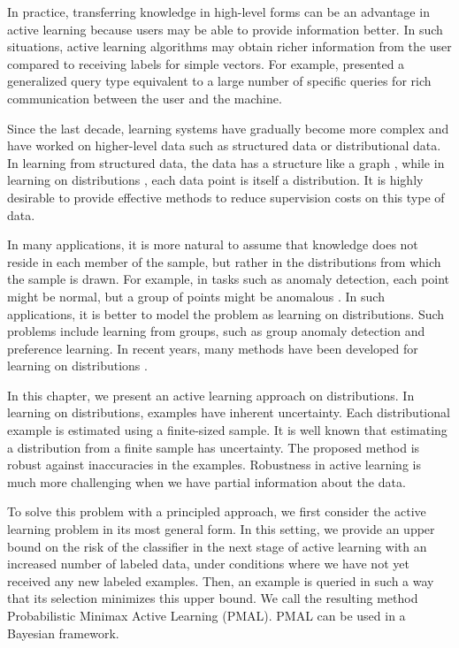 	In practice, transferring knowledge in high-level forms can be an advantage in active learning because users may be able to provide information better. In such situations, active learning algorithms may obtain richer information from the user compared to receiving labels for simple vectors. For example, \cite{gilad2015active} presented a generalized query type equivalent to a large number of specific queries for rich communication between the user and the machine.
	
	Since the last decade, learning systems have gradually become more complex and have worked on higher-level data such as structured data or distributional data. In learning from structured data, the data has a structure like a graph \cite{lampert2009structured}, while in learning on distributions \cite{sriperumbudur2009kernel}, each data point is itself a distribution. It is highly desirable to provide effective methods to reduce supervision costs on this type of data.
	
	In many applications, it is more natural to assume that knowledge does not reside in each member of the sample, but rather in the distributions from which the sample is drawn. For example, in tasks such as anomaly detection, each point might be normal, but a group of points might be anomalous \cite{nguyen2007kernel}. In such applications, it is better to model the problem as learning on distributions. Such problems include learning from groups, such as group anomaly detection and preference learning. In recent years, many methods have been developed for learning on distributions \cite{flaxman2015fast, szabo2015learning, muandet2012domain, borgwardt2006integrating}.
	
	In this chapter, we present an active learning approach on distributions. In learning on distributions, examples have inherent uncertainty. Each distributional example is estimated using a finite-sized sample. It is well known that estimating a distribution from a finite sample has uncertainty. The proposed method is robust against inaccuracies in the examples. Robustness in active learning is much more challenging when we have partial information about the data.
	
	To solve this problem with a principled approach, we first consider the active learning problem in its most general form. In this setting, we provide an upper bound on the risk of the classifier in the next stage of active learning with an increased number of labeled data, under conditions where we have not yet received any new labeled examples. Then, an example is queried in such a way that its selection minimizes this upper bound. We call the resulting method Probabilistic Minimax Active Learning (PMAL). PMAL can be used in a Bayesian framework.
	
